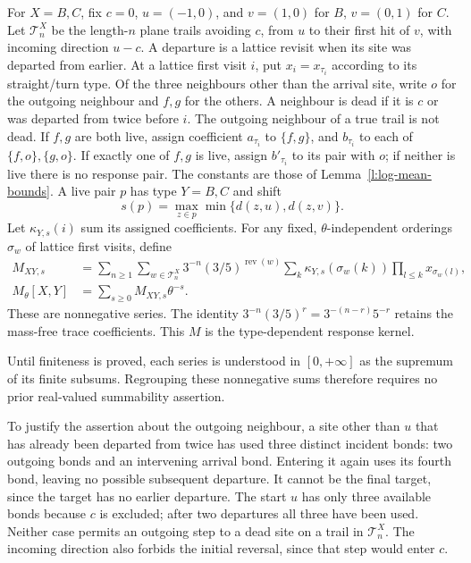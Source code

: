 \begin{definition}\label{d:kernel}
For \(X=B,C\), fix \(c=0\), \(u=(-1,0)\), and \(v=(1,0)\)
for \(B\), \(v=(0,1)\) for \(C\).
Let \(\mathcal T_n^X\) be the length-\(n\) plane trails avoiding \(c\),
from \(u\) to their first hit of \(v\), with incoming direction \(u-c\).
A departure is a lattice revisit when its site was departed from earlier.
At a lattice first visit \(i\), put \(x_i=x_{\tau_i}\) according to
its straight/turn type. Of the three neighbours other than the arrival
site, write \(o\) for the outgoing neighbour and \(f,g\) for the others.
A neighbour is dead if it is \(c\) or was departed from twice before \(i\).
The outgoing neighbour of a true trail is not dead.
If \(f,g\) are both live, assign coefficient \(a_{\tau_i}\) to
\(\{f,g\}\), and \(b_{\tau_i}\) to each of \(\{f,o\},\{g,o\}\).
If exactly one of \(f,g\) is live, assign \(b'_{\tau_i}\) to its
pair with \(o\); if neither is live there is no response pair.
The constants are those of Lemma~\ref{l:log-mean-bounds}.
A live pair \(p\) has type \(Y=B,C\) and shift
\[
 s(p)=\max_{z\in p}\min\{d(z,u),d(z,v)\}.
\]
Let \(\kappa_{Y,s}(i)\) sum its assigned coefficients.
For any fixed, \(\theta\)-independent orderings \(\sigma_w\) of lattice
first visits, define
\[
 \begin{split}
 M_{XY,s}
 &=\sum_{n\ge1}\sum_{w\in\mathcal T_n^X}
     3^{-n}(3/5)^{\operatorname{rev}(w)}
     \sum_k\kappa_{Y,s}(\sigma_w(k))
                   \prod_{l\le k}x_{\sigma_w(l)},\\
 M_\theta[X,Y]&=\sum_{s\ge0}M_{XY,s}\theta^{-s}.
 \end{split}
\]
These are nonnegative series. The identity
\(3^{-n}(3/5)^r=3^{-(n-r)}5^{-r}\) retains the mass-free
trace coefficients. This \(M\) is the type-dependent response kernel.
\end{definition}

Until finiteness is proved, each series is understood in
\([0,+\infty]\) as the supremum of its finite subsums.
Regrouping these nonnegative sums therefore requires no prior
real-valued summability assertion.

To justify the assertion about the outgoing neighbour, a site other
than \(u\) that has already been departed from twice has used three
distinct incident bonds: two outgoing bonds and an intervening
arrival bond.  Entering it again uses its fourth bond, leaving no
possible subsequent departure.  It cannot be the final target,
since the target has no earlier departure.  The start \(u\) has
only three available bonds because \(c\) is excluded; after two
departures all three have been used.  Neither case permits an
outgoing step to a dead site on a trail in \(\mathcal T_n^X\).
The incoming direction also forbids the initial reversal, since that
step would enter \(c\).

